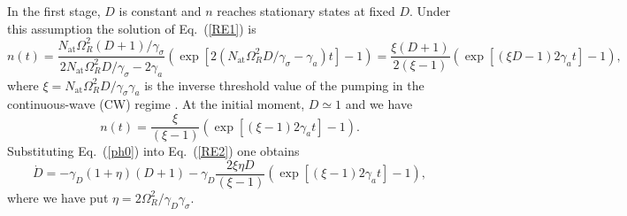 \documentclass[aps,pra,amsmath,amssymb,onecolumn,superscriptaddress,showpacs,floatfix,]{revtex4-1}
\begin{document}
In the first stage, $D$ is constant and $n$ reaches stationary states at fixed $D$.
Under this assumption the solution of Eq.~(\ref{RE1}) is
\begin{equation} 
n\left( t \right) = \frac{{{N_{\text{at}}}\Omega _R^2\left( {D + 1} \right)/{\gamma _\sigma }}}{{2{N_{\text{at}}}\Omega _R^2D/{\gamma _\sigma } - 2 {\gamma _a}}}\left( {\exp \left[ 2\left( {{N_{\text{at}}}\Omega _R^2D/{\gamma _\sigma } - {\gamma _a}} \right)t \right] - 1} \right) = \frac{{\xi \left( {D + 1} \right)}}{{2\left( {\xi-1} \right)}}\left( {\exp \left[\left( {\xi D - 1} \right) 2 {\gamma _a}t \right] - 1} \right), \label{ph}
\end{equation}
where $\xi={{N_{\text{at}}}\Omega _R^2D/{\gamma _\sigma \gamma_a }}$ is the inverse threshold value of the pumping in the continuous-wave (CW) regime \cite{ScullyQO}.
At the initial moment, $D \simeq 1$ and we have  
\begin{equation} 
n\left( t \right) = \frac{\xi }{{\left( {\xi - 1} \right)}}\left( {\exp \left[ \left( {\xi  - 1} \right) 2 {\gamma _a}t \right] - 1} \right). \label{ph0}
\end{equation}
Substituting Eq.~(\ref{ph0}) into Eq.~(\ref{RE2}) one obtains
\begin{equation} 
\dot D =  - {\gamma _D}\left( {1 + \eta } \right)\left( {D + 1} \right) - {\gamma _D}\frac{{2\xi \eta D}}{{\left( {\xi  - 1} \right)}}\left( {\exp \left[\left( {\xi  - 1} \right) 2 {\gamma _a}t \right] - 1} \right), \label{inv0}
\end{equation}
where we have put $\eta = 2 \Omega_R^2 /\gamma_D \gamma_\sigma$. 
\end{document}
